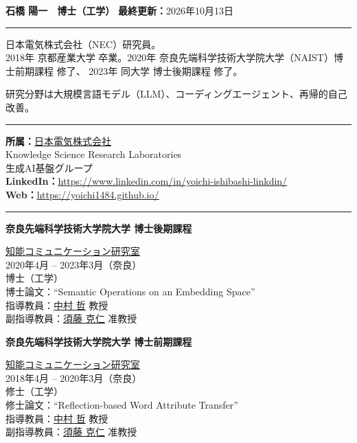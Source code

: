 \documentclass[11pt,a4paper]{article}
\let\oldhref\href
\renewcommand{\href}[2]{\oldhref{#1}{\uline{#2}}}
\renewcommand{\url}[1]{\oldhref{#1}{\uline{#1}}}
\newlength{\labelcol}\setlength{\labelcol}{1.2in}
\newlength{\labelgap}\setlength{\labelgap}{0.21in}
\newcommand{\cvsection}[1]{%
  \par\vspace{26pt}%
  {\noindent\rule{\textwidth}{2.4pt}\par}\nopagebreak\vspace{9pt}%
  \noindent\llap{\smash[b]{\parbox[t]{\labelcol}{\raggedright\large\bfseries #1}}\hspace{\labelgap}}\ignorespaces}
\newcommand{\entry}[1]{\par\vspace{10pt}\noindent\textbf{#1}\par\nopagebreak}
\newcommand{\entryfirst}[1]{\textbf{#1}\par\nopagebreak}
\newenvironment{indented}{%
  \par\nopagebreak
  \begin{list}{}{\setlength{\leftmargin}{0.3in}\setlength{\topsep}{1pt}%
    \setlength{\partopsep}{0pt}\setlength{\itemsep}{0pt}\setlength{\parsep}{1pt}}\item[]}{\end{list}}
\begin{document}
\noindent\hspace*{-1.5in}\parbox{\dimexpr\textwidth+1.5in\relax}{%
  {\huge\bfseries 石橋 陽一　博士（工学）}\hfill
  {\textbf{最終更新：}2026年10月13日}}

\cvsection{略歴}%
日本電気株式会社（NEC）研究員。\\
2018年 京都産業大学 卒業。2020年 奈良先端科学技術大学院大学（NAIST）博士前期課程 修了、
2023年 同大学 博士後期課程 修了。

\vspace{8pt}
研究分野は大規模言語モデル（LLM）、コーディングエージェント、再帰的自己改善。

\cvsection{連絡先}%
\textbf{所属：}\href{https://www.nec.com/en/global/rd/}{日本電気株式会社}\\
\hspace*{3em}Knowledge Science Research Laboratories\\
\hspace*{3em}生成AI基盤グループ\\
\textbf{LinkedIn：}\url{https://www.linkedin.com/in/yoichi-ishibashi-linkdin/}\\
\textbf{Web：}\url{https://yoichi1484.github.io/}

\cvsection{学歴}%
\entryfirst{奈良先端科学技術大学院大学 博士後期課程}
\begin{indented}
\href{https://ahcweb01.naist.jp/en/}{知能コミュニケーション研究室}\\
2020年4月 -- 2023年3月（奈良）\\[3pt]
博士（工学）\\[3pt]
博士論文：``Semantic Operations on an Embedding Space''\\[3pt]
指導教員：\href{https://ahcweb01.naist.jp/Prof.Nakamura/index_e.html}{中村 哲} 教授\\
副指導教員：\href{https://www.sudoh.nl/}{須藤 克仁} 准教授
\end{indented}

\entry{奈良先端科学技術大学院大学 博士前期課程}
\begin{indented}
\href{https://ahcweb01.naist.jp/en/}{知能コミュニケーション研究室}\\
2018年4月 -- 2020年3月（奈良）\\[3pt]
修士（工学）\\[3pt]
修士論文：``Reflection-based Word Attribute Transfer''\\[3pt]
指導教員：\href{https://ahcweb01.naist.jp/Prof.Nakamura/index_e.html}{中村 哲} 教授\\
副指導教員：\href{https://www.sudoh.nl/}{須藤 克仁} 准教授
\end{indented}
\end{document}
